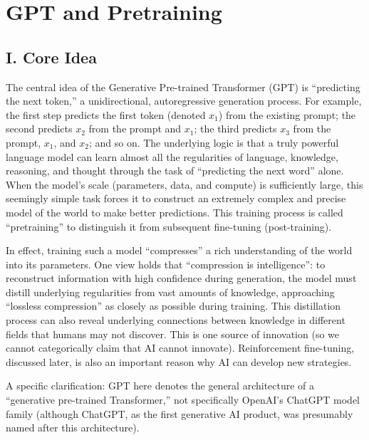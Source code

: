 \setcounter{section}{0}

\hypertarget{gpt-and-pretraining}{%
\section{GPT and Pretraining}\label{gpt-and-pretraining}}

\hypertarget{i.-core-idea-5}{%
\subsection{I. Core Idea}\label{i.-core-idea-5}}

The central idea of the Generative Pre-trained Transformer (GPT) is ``predicting the next token,'' a unidirectional, autoregressive generation process. For example, the first step predicts the first token (denoted \(x_1\)) from the existing prompt; the second predicts \(x_2\) from the prompt and \(x_1\); the third predicts \(x_3\) from the prompt, \(x_1\), and \(x_2\); and so on. The underlying logic is that a truly powerful language model can learn almost all the regularities of language, knowledge, reasoning, and thought through the task of ``predicting the next word'' alone. When the model's scale (parameters, data, and compute) is sufficiently large, this seemingly simple task forces it to construct an extremely complex and precise model of the world to make better predictions. This training process is called ``pretraining'' to distinguish it from subsequent fine-tuning (post-training).

In effect, training such a model ``compresses'' a rich understanding of the world into its parameters. One view holds that ``compression is intelligence'': to reconstruct information with high confidence during generation, the model must distill underlying regularities from vast amounts of knowledge, approaching ``lossless compression'' as closely as possible during training. This distillation process can also reveal underlying connections between knowledge in different fields that humans may not discover. This is one source of innovation (so we cannot categorically claim that AI cannot innovate). Reinforcement fine-tuning, discussed later, is also an important reason why AI can develop new strategies.

A specific clarification: GPT here denotes the general architecture of a ``generative pre-trained Transformer,'' not specifically OpenAI's ChatGPT model family (although ChatGPT, as the first generative AI product, was presumably named after this architecture).

